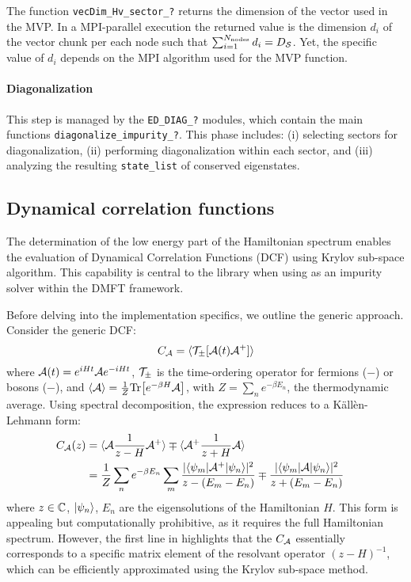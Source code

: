 \documentclass[edipack2.tex]{subfiles}
\begin{document}
The function {\tt vecDim\_Hv\_sector\_?} returns the 
dimension of the vector used in the
MVP. In a MPI-parallel execution the returned value is the
dimension $d_i$ of the vector chunk per each node such that
$\sum_{i=1}^{N_\mathrm{nodes}}d_i = D_\SS$. Yet, the specific value of $d_i$
depends on the MPI algorithm used for the MVP function.

\paragraph{\bf Diagonalization}
This step is managed by the {\tt ED\_DIAG\_?}
modules, which contain the main functions {\tt diagonalize\_impurity\_?}.
This phase includes: (i) selecting sectors for diagonalization, (ii)
performing diagonalization within each sector, and (iii) analyzing
the resulting {\tt state\_list} of conserved eigenstates.




\subsection{Dynamical correlation functions}\label{sSecGF}
The determination of the low energy part of the Hamiltonian spectrum
enables the evaluation of Dynamical Correlation Functions (DCF) using Krylov
sub-space algorithm.
This capability is central to the library when using \NAME as an
impurity solver within the DMFT framework.

Before delving into the implementation specifics, we outline the
generic approach. Consider the generic DCF:
\begin{equation}
  \label{eqGaa}
  C_\AA = \ibra \TT_\pm[ \AA(t) \AA^+ ]\iket
\end{equation}
where $\AA(t)=e^{iHt}\AA e^{-iHt}$, $\TT_\pm$ is the time-ordering
operator for fermions ($-$) or
bosons ($-$), and $\ibra \AA \iket=\frac{1}{Z}\Tr{ \left[ e^{-\beta
      H}\AA \right]}$, with $Z=\sum_ne^{-\beta E_n}$, the thermodynamic
average.
Using spectral decomposition, the expression  reduces to a
K\"all\`en-Lehmann form:
\begin{equation}\label{KLgf}
  \begin{split}
    C_\AA(z) 
    &=  \ibra \AA \frac{1}{z-H} \AA^+\iket
    \mp \ibra \AA^+ \frac{1}{z+H} \AA\iket \cr
    & =\frac{1}{Z}\sum_n e^{-\beta E_n}\sum_m
  \frac{ |\bra{\psi_m}\AA^+ \ket{\psi_n}|^2 }  {z-(E_m-E_n)}
  \mp
  \frac{ |\bra{\psi_m}\AA \ket{\psi_n}|^2 }  {z+(E_m-E_n)}\cr
\end{split}
\end{equation}
where $z\in\CCC$,  $\ket{\psi_n}$, $E_n$ are the eigensolutions of the
Hamiltonian $H$. 
This form is appealing but computationally prohibitive, as it requires
the full Hamiltonian spectrum. However, the first line in 
highlights that the $C_\AA$ essentially corresponds to a specific
matrix element of the resolvant operator $(z-H)^{-1}$, which can be
efficiently approximated using the Krylov sub-space method.
\end{document}
